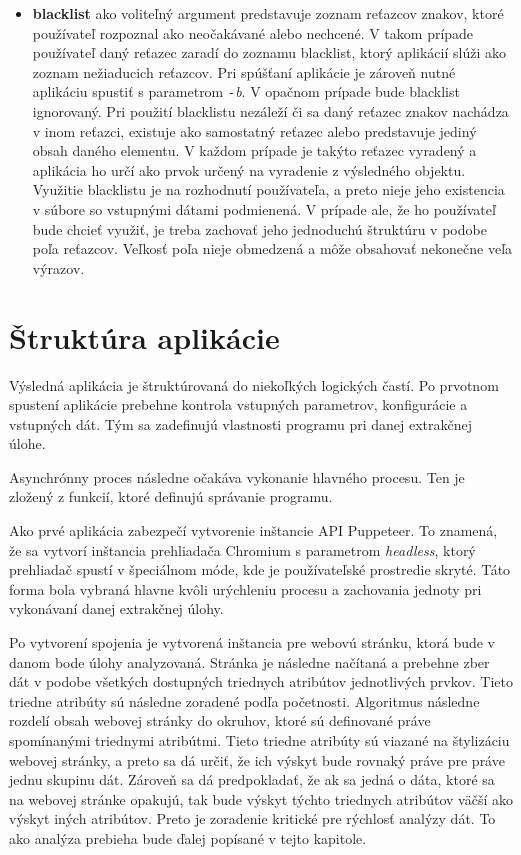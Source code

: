 \begin{itemize}
  \item \textbf{blacklist} ako voliteľný argument predstavuje zoznam reťazcov znakov, ktoré používateľ rozpoznal ako neočakávané alebo nechcené. V takom prípade používateľ daný reťazec zaradí do zoznamu blacklist, ktorý aplikácií slúži ako zoznam nežiaducich reťazcov. Pri spúšťaní aplikácie je zároveň nutné aplikáciu spustiť s parametrom \textit{\texttt{-}b}. V opačnom prípade bude blacklist ignorovaný. Pri použití blacklistu nezáleží či sa daný reťazec znakov nachádza v inom reťazci, existuje ako samostatný reťazec alebo predstavuje jediný obsah daného elementu. V každom prípade je takýto reťazec vyradený a aplikácia ho určí ako prvok určený na vyradenie z výsledného objektu. Využitie blacklistu je na rozhodnutí používateľa, a preto nieje jeho existencia v súbore so vstupnými dátami podmienená. V prípade ale, že ho používateľ bude chcieť využiť, je treba zachovať jeho jednoduchú štruktúru v podobe poľa reťazcov. Veľkosť poľa nieje obmedzená a môže obsahovať nekonečne veľa výrazov. 
 \end{itemize}
 
 \section{Štruktúra aplikácie}
 
 Výsledná aplikácia je štruktúrovaná do niekoľkých logických častí. Po prvotnom spustení aplikácie prebehne kontrola vstupných parametrov, konfigurácie a vstupných dát. Tým sa zadefinujú vlastnosti programu pri danej extrakčnej úlohe.
 
 Asynchrónny proces následne očakáva vykonanie hlavného procesu. Ten je zložený z funkcií, ktoré definujú správanie programu. 
 
 Ako prvé aplikácia zabezpečí vytvorenie inštancie API Puppeteer. To znamená, že sa vytvorí inštancia prehliadača Chromium s parametrom \textit{headless}, ktorý prehliadač spustí v špeciálnom móde, kde je používateľské prostredie skryté. Táto forma bola vybraná hlavne kvôli urýchleniu procesu a zachovania jednoty pri vykonávaní danej extrakčnej úlohy. 
 
 Po vytvorení spojenia je vytvorená inštancia pre webovú stránku, ktorá bude v danom bode úlohy analyzovaná. Stránka je následne načítaná a prebehne zber dát v podobe všetkých dostupných triednych atribútov jednotlivých prvkov. Tieto triedne atribúty sú následne zoradené podľa početnosti. Algoritmus následne rozdelí obsah webovej stránky do okruhov, ktoré sú definované práve spomínanými triednymi atribútmi. Tieto triedne atribúty sú viazané na štylizáciu webovej stránky, a preto sa dá určiť, že ich výskyt bude rovnaký práve pre práve jednu skupinu dát. Zároveň sa dá predpokladať, že ak sa jedná o dáta, ktoré sa na webovej stránke opakujú, tak bude výskyt týchto triednych atribútov väčší ako výskyt iných atribútov. Preto je zoradenie kritické pre rýchlosť analýzy dát. To ako analýza prebieha bude ďalej popísané v tejto kapitole.
 
